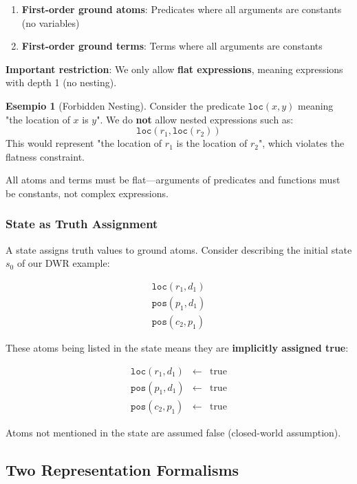 \documentclass[11pt,a4paper]{article}
\theoremstyle{definition}
\newtheorem{example}{Esempio}[section]
\theoremstyle{plain}
\theoremstyle{remark}
\begin{document}
\begin{enumerate}
    \item \textbf{First-order ground atoms}: Predicates where all arguments are constants (no variables)
    \item \textbf{First-order ground terms}: Terms where all arguments are constants
\end{enumerate}

\textbf{Important restriction}: We only allow \textbf{flat expressions}, meaning expressions with depth 1 (no nesting).

\begin{example}[Forbidden Nesting]
Consider the predicate $\texttt{loc}(x, y)$ meaning "the location of $x$ is $y$". We do \textbf{not} allow nested expressions such as:
\[
\texttt{loc}(r_1, \texttt{loc}(r_2))
\]
This would represent "the location of $r_1$ is the location of $r_2$", which violates the flatness constraint.
\end{example}

All atoms and terms must be flat—arguments of predicates and functions must be constants, not complex expressions.

\subsubsection{State as Truth Assignment}

A state assigns truth values to ground atoms. Consider describing the initial state $s_0$ of our DWR example:

\[
\begin{array}{l}
\texttt{loc}(r_1, d_1) \\
\texttt{pos}(p_1, d_1) \\
\texttt{pos}(c_2, p_1)
\end{array}
\]

These atoms being listed in the state means they are \textbf{implicitly assigned true}:

\[
\begin{array}{lcl}
\texttt{loc}(r_1, d_1) & \leftarrow & \text{true} \\
\texttt{pos}(p_1, d_1) & \leftarrow & \text{true} \\
\texttt{pos}(c_2, p_1) & \leftarrow & \text{true}
\end{array}
\]

Atoms not mentioned in the state are assumed false (closed-world assumption).

\subsection{Two Representation Formalisms}
\end{document}
